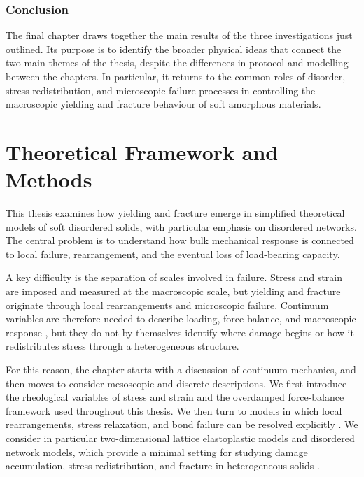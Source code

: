 \documentclass[asymmetricmargins]{library/duthesis}%
\begin{document}
\subsection*{Conclusion}
The final chapter draws together the main results of the three investigations just outlined. Its purpose is to identify the broader physical ideas that connect the two main themes of the thesis, despite the differences in protocol and modelling between the chapters. In particular, it returns to the common roles of disorder, stress redistribution, and microscopic failure processes in controlling the macroscopic yielding and fracture behaviour of soft amorphous materials.
 \newpage       
 \newpage %

\setcounter{equation}{0}
\chapter{Theoretical Framework and Methods} \label{sec:Background}

This thesis examines how yielding and fracture emerge in simplified theoretical models of soft disordered solids, with particular emphasis on disordered networks. The central problem is to understand how bulk mechanical response is connected to local failure, rearrangement, and the eventual loss of load-bearing capacity.

A key difficulty is the separation of scales involved in failure. Stress and strain are imposed and measured at the macroscopic scale, but yielding and fracture originate through local rearrangements and microscopic failure. Continuum variables are therefore needed to describe loading, force balance, and macroscopic response \cite{chandrasekharaiahContinuumMechanics2014,lubliner2008plasticity,macoskoRheologyPrinciplesMeasurements1994}, but they do not by themselves identify where damage begins or how it redistributes stress through a heterogeneous structure.

For this reason, the chapter starts with a discussion of continuum mechanics, and then moves to consider mesoscopic and discrete descriptions. We first introduce the rheological variables of stress and strain and the overdamped force-balance framework used throughout this thesis. We then turn to models in which local rearrangements, stress relaxation, and bond failure can be resolved explicitly \cite{falk_dynamics_1998,maloney_amorphous_2006,tanguy_plastic_2006,gartner_nonlinear_2016,picard_elastic_2004}. We consider in particular two-dimensional lattice elastoplastic models and disordered network models, which provide a minimal setting for studying damage accumulation, stress redistribution, and fracture in heterogeneous solids \cite{mackintosh_elasticity_1995,storm_nonlinear_2005,broedersz_modeling_2014,broedersz_criticality_2011,feng_nonlinear_2016,tauber_stretchy_2022}.
\end{document}
